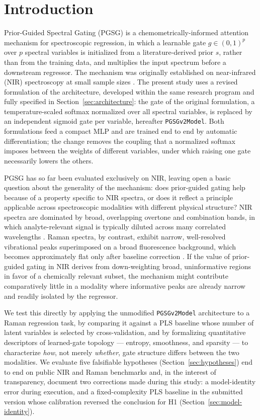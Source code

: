 \documentclass[preprint,12pt]{elsarticle}
\begin{document}
\linenumbers

\section{Introduction}
\label{sec:intro}

Prior-Guided Spectral Gating (PGSG) is a chemometrically-informed attention mechanism for spectroscopic regression, in which a learnable gate $g\in(0,1)^{p}$ over $p$ spectral variables is initialized from a literature-derived prior $s$, rather than from the training data, and multiplies the input spectrum before a downstream regressor. The mechanism was originally established on near-infrared (NIR) spectroscopy at small sample sizes \cite{coelho_pgsg0}. The present study uses a revised formulation of the architecture, developed within the same research program and fully specified in Section~\ref{sec:architecture}: the gate of the original formulation, a temperature-scaled softmax normalized over all spectral variables, is replaced by an independent sigmoid gate per variable, hereafter \texttt{PGSGv2Model}. Both formulations feed a compact MLP and are trained end to end by automatic differentiation; the change removes the coupling that a normalized softmax imposes between the weights of different variables, under which raising one gate necessarily lowers the others.

PGSG has so far been evaluated exclusively on NIR, leaving open a basic question about the generality of the mechanism: does prior-guided gating help because of a property specific to NIR spectra, or does it reflect a principle applicable across spectroscopic modalities with different physical structure? NIR spectra are dominated by broad, overlapping overtone and combination bands, in which analyte-relevant signal is typically diluted across many correlated wavelengths \cite{workman2012nir}. Raman spectra, by contrast, exhibit narrow, well-resolved vibrational peaks superimposed on a broad fluorescence background, which becomes approximately flat only after baseline correction \cite{smith2019raman}. If the value of prior-guided gating in NIR derives from down-weighting broad, uninformative regions in favor of a chemically relevant subset, the mechanism might contribute comparatively little in a modality where informative peaks are already narrow and readily isolated by the regressor.

We test this directly by applying the unmodified \texttt{PGSGv2Model} architecture to a Raman regression task, by comparing it against a PLS baseline whose number of latent variables is selected by cross-validation, and by formalizing quantitative descriptors of learned-gate topology --- entropy, smoothness, and sparsity --- to characterize \emph{how}, not merely \emph{whether}, gate structure differs between the two modalities. We evaluate five falsifiable hypotheses (Section~\ref{sec:hypotheses}) end to end on public NIR and Raman benchmarks and, in the interest of transparency, document two corrections made during this study: a model-identity error during execution, and a fixed-complexity PLS baseline in the submitted version whose calibration reversed the conclusion for H1 (Section~\ref{sec:model-identity}).
\end{document}
